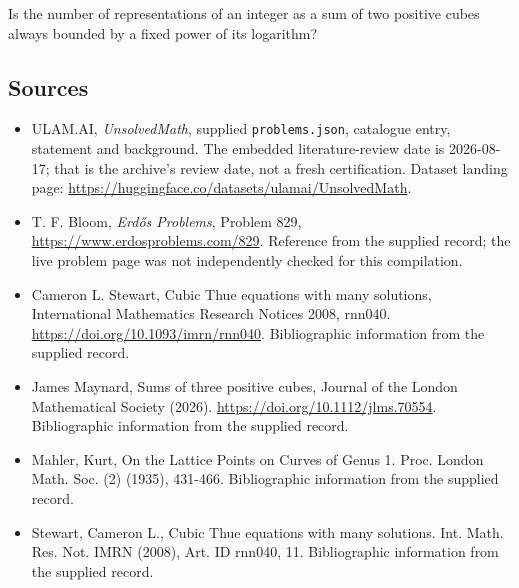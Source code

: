 \documentclass[11pt,a4paper]{article}
\begin{document}
Is the number of representations of an integer as a sum of two positive cubes always bounded by a fixed power of its logarithm?

\subsection{Sources}

{\small

\begin{itemize}

\item[\hypertarget{source:statement:1}{S1}] ULAM.AI, \emph{UnsolvedMath}, supplied \texttt{problems.json}, catalogue entry, statement and background. The embedded literature-review date is 2026-08-17; that is the archive’s review date, not a fresh certification. Dataset landing page: \url{https://huggingface.co/datasets/ulamai/UnsolvedMath}.

\item[\hypertarget{source:statement:2}{S2}] T. F. Bloom, \emph{Erdős Problems}, Problem 829, \url{https://www.erdosproblems.com/829}. Reference from the supplied record; the live problem page was not independently checked for this compilation.

\item[\hypertarget{source:statement:3}{S3}] Cameron L. Stewart, Cubic Thue equations with many solutions, International Mathematics Research Notices 2008, rnn040. \url{https://doi.org/10.1093/imrn/rnn040}. Bibliographic information from the supplied record.

\item[\hypertarget{source:statement:4}{S4}] James Maynard, Sums of three positive cubes, Journal of the London Mathematical Society (2026). \url{https://doi.org/10.1112/jlms.70554}. Bibliographic information from the supplied record.

\item[\hypertarget{source:statement:5}{S5}] Mahler, Kurt, On the Lattice Points on Curves of Genus 1. Proc. London Math. Soc. (2) (1935), 431-466. Bibliographic information from the supplied record.

\item[\hypertarget{source:statement:6}{S6}] Stewart, Cameron L., Cubic {T}hue equations with many solutions. Int. Math. Res. Not. IMRN (2008), Art. ID rnn040, 11. Bibliographic information from the supplied record.

\end{itemize}

}

\label{end:statement}
\end{document}
